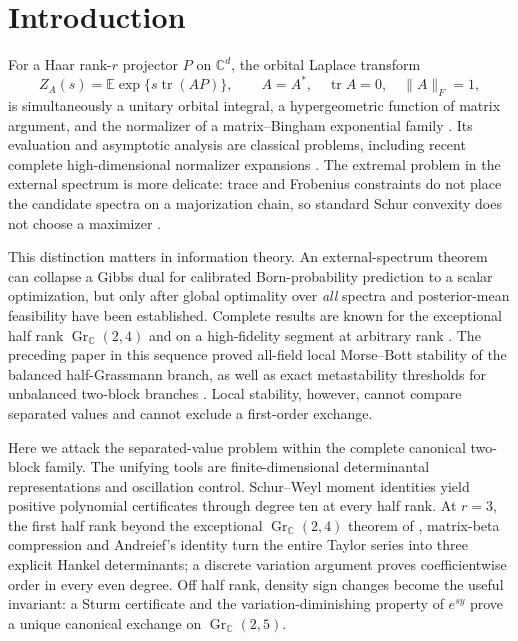 \documentclass[11pt]{article}
\newcommand{\E}{\mathbb E}
\newcommand{\C}{\mathbb C}
\newcommand{\tr}{\operatorname{tr}}
\newcommand{\Gr}{\operatorname{Gr}}
\newcommand{\norm}[1]{\lVert#1\rVert}
\begin{document}
\section{Introduction}

For a Haar rank-$r$ projector $P$ on $\C^d$, the orbital Laplace transform
\begin{equation}
 Z_A(s)=\E\exp\{s\tr(AP)\},\qquad A=A^*,\quad \tr A=0,
 \quad \norm A_F=1,                                      \tag{1.1}
\end{equation}
is simultaneously a unitary orbital integral, a hypergeometric function of
matrix argument, and the normalizer of a matrix--Bingham exponential family
\cite{James1964,Muirhead1982,Kent1994,ItzyksonZuber1980}.  Its evaluation and
asymptotic analysis are classical problems, including recent complete
high-dimensional normalizer expansions \cite{BagyanRichards2024}.  The
extremal problem in the
external spectrum is more delicate: trace and Frobenius constraints do not
place the candidate spectra on a majorization chain, so standard Schur
convexity does not choose a maximizer
\cite{Sra2016,McSwiggenNovak2022,McSwiggenSahi2026}.

This distinction matters in information theory.  An external-spectrum
theorem can collapse a Gibbs dual for calibrated Born-probability prediction
to a scalar optimization, but only after global optimality over \emph{all}
spectra and posterior-mean feasibility have been established.  Complete
results are known for the exceptional half rank $\Gr_{\C}(2,4)$ and on a
high-fidelity segment at arbitrary rank \cite{ErikssonRankTwo2026,
ErikssonHighFidelity2026}.  The preceding paper in this sequence proved
all-field local Morse--Bott stability of the balanced half-Grassmann branch,
as well as exact metastability thresholds for unbalanced two-block branches
\cite{ErikssonMorseBott2026}.  Local stability, however, cannot compare
separated values and cannot exclude a first-order exchange.

Here we attack the separated-value problem within the complete canonical
two-block family.  The unifying tools are finite-dimensional determinantal
representations and oscillation control.  Schur--Weyl moment identities yield
positive polynomial certificates through degree ten at every half rank.
 At $r=3$, the first half rank beyond the exceptional $\Gr_{\C}(2,4)$
 theorem of \cite{ErikssonRankTwo2026}, matrix-beta compression and
 Andreief's identity turn the entire Taylor series into three explicit
 Hankel determinants; a discrete variation argument proves coefficientwise
 order in every even degree.
Off half rank, density sign changes become the useful invariant: a Sturm
certificate and the variation-diminishing property of $e^{sy}$ prove a
unique canonical exchange on $\Gr_{\C}(2,5)$.
\end{document}
